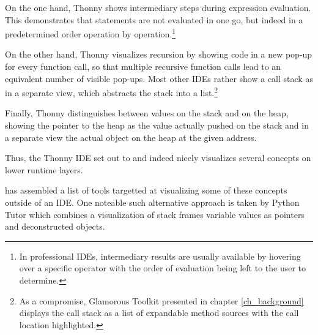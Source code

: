 On the one hand, Thonny shows intermediary steps during expression evaluation. This demonstrates that statements are not evaluated in one go, but indeed in a predetermined order operation by operation.\footnote{In professional IDEs, intermediary results are usually available by hovering over a specific operator with the order of evaluation being left to the user to determine.}

On the other hand, Thonny visualizes recursion by showing code in a new pop-up for every function call, so that multiple recursive function calls lead to an equivalent number of visible pop-ups. Most other IDEs rather show a call stack as in a separate view, which abstracts the stack into a list.\footnote{As a compromise, Glamorous Toolkit presented in chapter \ref{ch_background} displays the call stack as a list of expandable method sources with the call location highlighted.}

Finally, Thonny distinguishes between values on the stack and on the heap, showing the pointer to the heap as the value actually pushed on the stack and in a separate view the actual object on the heap at the given address.

Thus, the Thonny IDE set out to and indeed nicely visualizes several concepts on lower runtime layers.

\cite{Jal22} has assembled a list of tools targetted at visualizing some of these concepts outside of an IDE. One noteable such alternative approach is taken by Python Tutor \citep{Pyt25} which combines a visualization of stack frames variable values as pointers and deconstructed objects.
